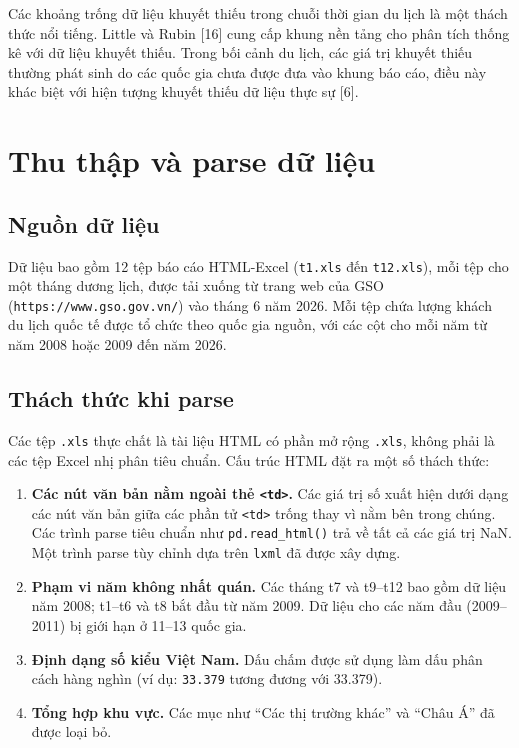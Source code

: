 \documentclass[
]{article}
\begin{document}
Các khoảng trống dữ liệu khuyết thiếu trong chuỗi thời gian du lịch là
một thách thức nổi tiếng. Little và Rubin {[}16{]} cung cấp khung nền
tảng cho phân tích thống kê với dữ liệu khuyết thiếu. Trong bối cảnh du
lịch, các giá trị khuyết thiếu thường phát sinh do các quốc gia chưa
được đưa vào khung báo cáo, điều này khác biệt với hiện tượng khuyết
thiếu dữ liệu thực sự {[}6{]}.

\newpage

\section{Thu thập và parse dữ
liệu}\label{thu-thux1eadp-vuxe0-parse-dux1eef-liux1ec7u}

\subsection{Nguồn dữ liệu}\label{nguux1ed3n-dux1eef-liux1ec7u}

Dữ liệu bao gồm 12 tệp báo cáo HTML-Excel (\texttt{t1.xls} đến
\texttt{t12.xls}), mỗi tệp cho một tháng dương lịch, được tải xuống từ
trang web của GSO (\texttt{https://www.gso.gov.vn/}) vào tháng 6 năm
2026. Mỗi tệp chứa lượng khách du lịch quốc tế được tổ chức theo quốc
gia nguồn, với các cột cho mỗi năm từ năm 2008 hoặc 2009 đến năm 2026.

\subsection{Thách thức khi parse}\label{thuxe1ch-thux1ee9c-khi-parse}

Các tệp \texttt{.xls} thực chất là tài liệu HTML có phần mở rộng
\texttt{.xls}, không phải là các tệp Excel nhị phân tiêu chuẩn. Cấu trúc
HTML đặt ra một số thách thức:

\begin{enumerate}
\def\labelenumi{\arabic{enumi}.}
\item
  \textbf{Các nút văn bản nằm ngoài thẻ
  \texttt{\textless{}td\textgreater{}}.} Các giá trị số xuất hiện dưới
  dạng các nút văn bản giữa các phần tử
  \texttt{\textless{}td\textgreater{}} trống thay vì nằm bên trong
  chúng. Các trình parse tiêu chuẩn như \texttt{pd.read\_html()} trả về
  tất cả các giá trị NaN. Một trình parse tùy chỉnh dựa trên
  \texttt{lxml} đã được xây dựng.
\item
  \textbf{Phạm vi năm không nhất quán.} Các tháng t7 và t9--t12 bao gồm
  dữ liệu năm 2008; t1--t6 và t8 bắt đầu từ năm 2009. Dữ liệu cho các
  năm đầu (2009--2011) bị giới hạn ở 11--13 quốc gia.
\item
  \textbf{Định dạng số kiểu Việt Nam.} Dấu chấm được sử dụng làm dấu
  phân cách hàng nghìn (ví dụ: \texttt{33.379} tương đương với 33.379).
\item
  \textbf{Tổng hợp khu vực.} Các mục như ``Các thị trường khác'' và
  ``Châu Á'' đã được loại bỏ.
\end{enumerate}
\end{document}
